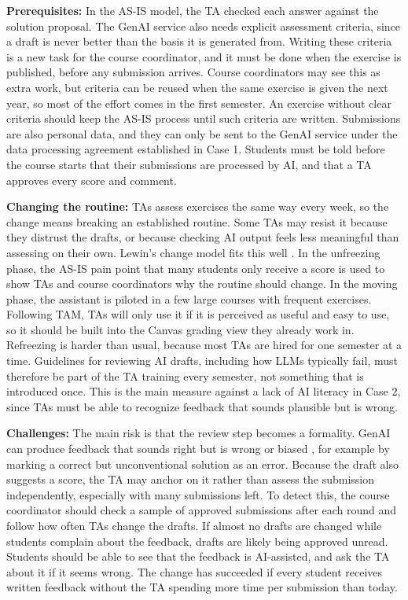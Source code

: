 \textbf{Prerequisites:}
In the AS-IS model, the TA checked each answer against the solution proposal. The GenAI service also needs explicit assessment criteria, since a draft is never better than the basis it is generated from. Writing these criteria is a new task for the course coordinator, and it must be done when the exercise is published, before any submission arrives. Course coordinators may see this as extra work, but criteria can be reused when the same exercise is given the next year, so most of the effort comes in the first semester. An exercise without clear criteria should keep the AS-IS process until such criteria are written. Submissions are also personal data, and they can only be sent to the GenAI service under the data processing agreement established in Case 1. Students must be told before the course starts that their submissions are processed by AI, and that a TA approves every score and comment.

\textbf{Changing the routine:}
TAs assess exercises the same way every week, so the change means breaking an established routine. Some TAs may resist it because they distrust the drafts, or because checking AI output feels less meaningful than assessing on their own. Lewin's change model fits this well \parencite{stair}. In the unfreezing phase, the AS-IS pain point that many students only receive a score is used to show TAs and course coordinators why the routine should change. In the moving phase, the assistant is piloted in a few large courses with frequent exercises. Following TAM, TAs will only use it if it is perceived as useful and easy to use, so it should be built into the Canvas grading view they already work in. Refreezing is harder than usual, because most TAs are hired for one semester at a time. Guidelines for reviewing AI drafts, including how LLMs typically fail, must therefore be part of the TA training every semester, not something that is introduced once. This is the main measure against a lack of AI literacy in Case 2, since TAs must be able to recognize feedback that sounds plausible but is wrong.

\textbf{Challenges:}
The main risk is that the review step becomes a formality. GenAI can produce feedback that sounds right but is wrong or biased \parencite{qian2025}, for example by marking a correct but unconventional solution as an error. Because the draft also suggests a score, the TA may anchor on it rather than assess the submission independently, especially with many submissions left. To detect this, the course coordinator should check a sample of approved submissions after each round and follow how often TAs change the drafts. If almost no drafts are changed while students complain about the feedback, drafts are likely being approved unread. Students should be able to see that the feedback is AI-assisted, and ask the TA about it if it seems wrong. The change has succeeded if every student receives written feedback without the TA spending more time per submission than today.


